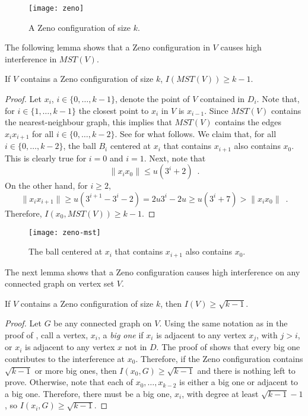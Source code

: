 \documentclass{patmorin}
\newcommand{\mst}{\mathit{MST}}
\begin{document}
\begin{figure*}
  \begin{center}
    \texttt{[image: zeno]}
  \end{center}
  \caption{A Zeno configuration of size $k$.}
\end{figure*}


The following lemma shows that a Zeno configuration in $V$ causes high
interference in $\mst(V)$.

\begin{lem}
If $V$ contains a Zeno configuration of size $k$, $I(\mst(V))\ge k-1$.
\end{lem}

\begin{proof}
Let $x_i$, $i\in\{0,\ldots,k-1\}$, denote the point of $V$ contained in
$D_i$.  Note that, for $i\in\{1,\ldots,k-1\}$ the closest point to $x_i$
in $V$ is $x_{i-1}$.  Since $\mst(V)$ contains the nearest-neighbour
graph, this implies that $\mst(V)$ contains the edges $x_ix_{i+1}$ for
all $i\in\{0,\ldots,k-2\}$.  See  for what follows.
We claim that, for all $i\in\{0,\ldots,k-2\}$, the ball $B_i$ centered
at $x_i$ that contains $x_{i+1}$ also contains $x_0$.  This is clearly
true for $i=0$ and $i=1$.  Next, note that
\[
  \|x_ix_0\| \le u(3^i+2) \enspace .
\]
On the other hand, for $i\ge 2$,
\[
  \|x_ix_{i+1}\| \ge u(3^{i+1}-3^i-2) = 2u3^i-2u \ge u(3^i + 7) > 
\|x_ix_0\| \enspace .
\]
Therefore, $I(x_0,\mst(V)) \ge k-1$.
\end{proof}

\begin{figure}
  \begin{center}
    \texttt{[image: zeno-mst]}
  \end{center}
  \caption{The ball centered at $x_i$ that contains $x_{i+1}$ also contains $x_0$.}
\end{figure}

The next lemma shows that a Zeno configuration causes high interference on
any connected graph on vertex set $V$.

\begin{lem}
If $V$ contains a Zeno configuration of size $k$, then $I(V)\ge\sqrt{k-1}$.
\end{lem}

\begin{proof}
Let $G$ be any connected graph on $V$.  Using the same notation as
in the proof of , call a vertex, $x_i$, a \emph{big
one} if $x_i$ is adjacent to any vertex $x_j$, with $j>i$, or $x_i$ is
adjacent to any vertex $x$ not in $D$.  The proof of 
shows that every big one contributes to the interference at $x_0$.
Therefore, if the Zeno configuration contains $\sqrt{k-1}$ or more big
ones, then $I(x_0,G)\ge\sqrt{k-1}$ and there is nothing left to prove.
Otherwise, note that each of $x_0,\ldots,x_{k-2}$ is either a big one
or adjacent to a big one. Therefore, there must be a big one, $x_i$,
with degree at least $\sqrt{k-1}-1$, so $I(x_i,G)\ge\sqrt{k-1}$.
\end{proof}
\end{document}
